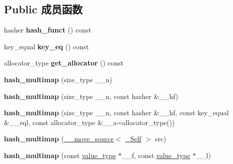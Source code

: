 \subsection*{Public 成员函数}
\begin{DoxyCompactItemize}
\item 
\mbox{\label{classhash__multimap_a3ebdfa202342273db2f1500825608f17}} 
hasher {\bfseries hash\+\_\+funct} () const
\item 
\mbox{\label{classhash__multimap_ae4117d10c95f7afd63cab5825f7905c7}} 
key\+\_\+equal {\bfseries key\+\_\+eq} () const
\item 
\mbox{\label{classhash__multimap_ae9a0096a7f6f3be54a679cdef7548da4}} 
allocator\+\_\+type {\bfseries get\+\_\+allocator} () const
\item 
\mbox{\label{classhash__multimap_ad7a9bb22a4c4d080f74f4de2c19a3f34}} 
{\bfseries hash\+\_\+multimap} (size\+\_\+type \+\_\+\+\_\+n)
\item 
\mbox{\label{classhash__multimap_a6aa3c72a2f0eedad2872c2b45014c9ad}} 
{\bfseries hash\+\_\+multimap} (size\+\_\+type \+\_\+\+\_\+n, const hasher \&\+\_\+\+\_\+hf)
\item 
\mbox{\label{classhash__multimap_a4c493e78ca1e1c41a6f3cff2c0e7e6f9}} 
{\bfseries hash\+\_\+multimap} (size\+\_\+type \+\_\+\+\_\+n, const hasher \&\+\_\+\+\_\+hf, const key\+\_\+equal \&\+\_\+\+\_\+eql, const allocator\+\_\+type \&\+\_\+\+\_\+a=allocator\+\_\+type())
\item 
\mbox{\label{classhash__multimap_a61e1cc59db511f021d4f428cb16aecdc}} 
{\bfseries hash\+\_\+multimap} (\hyperlink{class____move__source}{\+\_\+\+\_\+move\+\_\+source}$<$ \hyperlink{classhash__multimap}{\+\_\+\+Self} $>$ src)
\item 
\mbox{\label{classhash__multimap_ac4bd6e144d994dd5a6e03f23db2dd3c0}} 
{\bfseries hash\+\_\+multimap} (const \hyperlink{structpair}{value\+\_\+type} $\ast$\+\_\+\+\_\+f, const \hyperlink{structpair}{value\+\_\+type} $\ast$\+\_\+\+\_\+l)
\item 

\end{DoxyCompactItemize}
